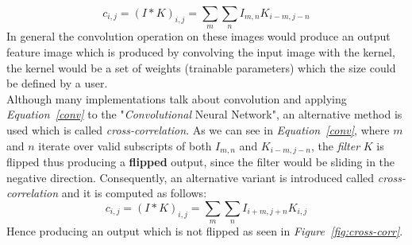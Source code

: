 \documentclass[12pt]{extarticle}
\begin{document}
	\begin{equation}\label{conv}
		c_{i,j} = (I*K)_{i,j} = \sum_{m}\sum_{n}I_{m,n}K_{i-m,j-n}
	\end{equation}
	In general the convolution operation on these images would produce an output feature image which is produced by convolving the input image with the kernel, the kernel would be a set of weights (trainable parameters) which the size could be defined by a user.\\[5mm]
	Although many implementations talk about convolution and applying \emph{Equation~\ref{conv}} to the "\emph{Convolutional} Neural Network", an alternative method is used which is called \emph{cross-correlation}. As we can see in \emph{Equation~\ref{conv}}, where $m$ and $n$ iterate over valid subscripts of both $I_{m,n}$ and $K_{i-m,j-n}$, the \emph{filter} $K$ is flipped thus producing a \textbf{flipped} output, since the filter would be sliding in the negative direction. Consequently, an alternative variant is introduced called \emph{cross-correlation} and it is computed as follows:
	\begin{equation}\label{cross-corr}
		c_{i,j} = (I*K)_{i,j} = \sum_{m}\sum_{n}I_{i+m,j+n}K_{i,j}
	\end{equation}
	Hence producing an output which is not flipped as seen in \emph{Figure~\ref{fig:cross-corr}}. 
	
\end{document}

